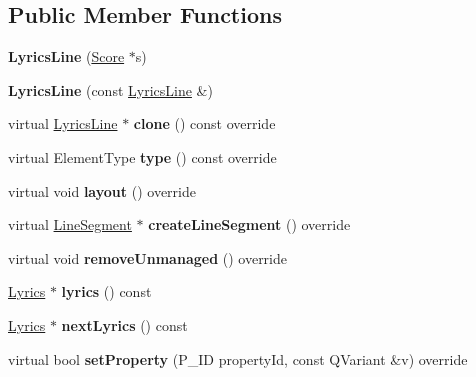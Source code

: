 \subsection*{Public Member Functions}
\begin{DoxyCompactItemize}
\item 
\mbox{\label{class_ms_1_1_lyrics_line_a21ab77b297d07bb100f6599cca511473}} 
{\bfseries Lyrics\+Line} (\hyperlink{class_ms_1_1_score}{Score} $\ast$s)
\item 
\mbox{\label{class_ms_1_1_lyrics_line_a66be01a2e4ec76d30b48504a9964d01f}} 
{\bfseries Lyrics\+Line} (const \hyperlink{class_ms_1_1_lyrics_line}{Lyrics\+Line} \&)
\item 
\mbox{\label{class_ms_1_1_lyrics_line_a975927f997ac8e96ffb8ae0a44426545}} 
virtual \hyperlink{class_ms_1_1_lyrics_line}{Lyrics\+Line} $\ast$ {\bfseries clone} () const override
\item 
\mbox{\label{class_ms_1_1_lyrics_line_a0ca1f225e14832b37ec32c56bfdde0ed}} 
virtual Element\+Type {\bfseries type} () const override
\item 
\mbox{\label{class_ms_1_1_lyrics_line_adad1fdc7b469efaee142946415de5f3f}} 
virtual void {\bfseries layout} () override
\item 
\mbox{\label{class_ms_1_1_lyrics_line_a33d358c3d77cb25cba104d600a81f745}} 
virtual \hyperlink{class_ms_1_1_line_segment}{Line\+Segment} $\ast$ {\bfseries create\+Line\+Segment} () override
\item 
\mbox{\label{class_ms_1_1_lyrics_line_a061594845e3f0345a19d70e76ff66bf4}} 
virtual void {\bfseries remove\+Unmanaged} () override
\item 
\mbox{\label{class_ms_1_1_lyrics_line_a0de9f26b65a99b3dd84140a9aad4404b}} 
\hyperlink{class_ms_1_1_lyrics}{Lyrics} $\ast$ {\bfseries lyrics} () const
\item 
\mbox{\label{class_ms_1_1_lyrics_line_a27aa11d2b9fdae93e09e4527fa1a3d06}} 
\hyperlink{class_ms_1_1_lyrics}{Lyrics} $\ast$ {\bfseries next\+Lyrics} () const
\item 
\mbox{\label{class_ms_1_1_lyrics_line_ac572ecdeb684438a2499011341fafff4}} 
virtual bool {\bfseries set\+Property} (P\+\_\+\+ID property\+Id, const Q\+Variant \&v) override
\end{DoxyCompactItemize}
